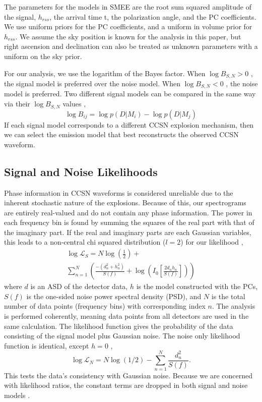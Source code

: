 \documentclass[letterpaper, aps, prd, twocolumn, superscriptaddress, showpacs, nofootinbib]{revtex4}
\begin{document}
The parameters for the models in SMEE are the root sum squared amplitude of the signal, $h_{rss}$, the arrival time t, the polarization angle, and the PC coefficients. We use uniform priors for the PC coefficients, and a uniform in volume prior for $h_{rss}$. We assume the sky position is known for the analysis in this paper, but right ascension and declination can also be treated as unknown parameters with a uniform on the sky prior.

For our analysis, we use the logarithm of the Bayes factor. When $\log B_{S,N} > 0$ , the signal model is preferred over the noise model. When $\log B_{S,N} < 0$ , the noise model is preferred. Two different signal models can be compared in the same way via their $\log B_{S,N}$ values \cite{veitch:15},
\begin{equation}
\log B_{ij} = \log p(D|M_{i}) - \log p(D|M_{j})
\end{equation}
If each signal model corresponds to a different CCSN explosion mechanism, then we can select the emission model that best reconstructs the observed CCSN waveform.

\subsection{Signal and Noise Likelihoods}

Phase information in CCSN waveforms is considered unreliable due to the inherent stochastic nature of the explosions. Because of this, our spectrograms are entirely real-valued and do not contain any phase information. The power in each frequency bin is found by summing the squares of the real part with that of the imaginary part. If the real and imaginary parts are each Gaussian variables, this leads to a non-central chi squared distribution ($l = 2$) for our likelihood \cite{logue:12},
\begin{multline}
\log \mathcal{L}_{S} = N\log\left(\frac{1}{2}\right) + \\ \sum_{n=1}^{N} \left( \frac{-(d_{n}^{2} + h_{n}^{2})}{S(f)} +  \log\left(I_0\left[\frac{2 d_{n} h_{n}}{S(f)}\right]\right) \right)
\end{multline}
where $d$ is an ASD of the detector data, $h$ is the model constructed with the PCs, $S(f)$ is the one-sided noise power spectral density (PSD), and $N$ is the total number of data points (frequency bins) with corresponding index $n$. The analysis is performed coherently, meaning data points from all detectors are used in the same calculation. The likelihood function gives the probability of the data consisting of the signal model plus Gaussian noise. The noise only likelihood function is identical, except $h = 0$ \cite{logue:12},
\begin{equation}
\log \mathcal{L}_{N} = N\log(1/2) - \sum_{n=1}^{N} \frac{d_{n}^{2}}{S(f)} .
\end{equation}
This tests the data's consistency with Gaussian noise. Because we are concerned with likelihood ratios, the constant terms are dropped in both signal and noise models \cite{logue:12, powell:16b}.
\end{document}
